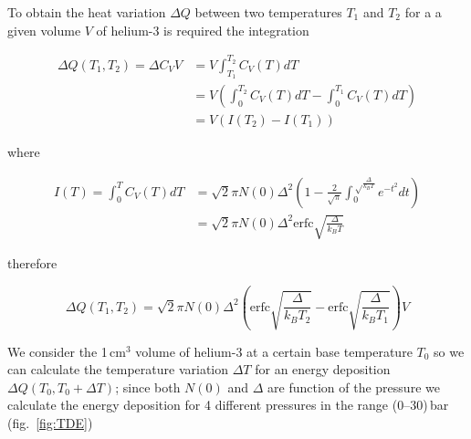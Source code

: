 \documentclass[a4paper,10pt]{article}
\begin{document}
To obtain the heat variation $\Delta Q$ between two temperatures $T_1$ and $T_2$ for a a given volume $V$ of helium-3 is required the integration

\begin{align}
\Delta Q (T_1,T_2) = \Delta C_V V & = V \int_{T_1}^{T_2} C_V(T)dT \\
                                  & = V \left( \int_{0}^{T_2} C_V(T)dT - \int_{0}^{T_1} C_V(T)dT \right)\\
                                  & = V \left( I(T_2) - I(T_1) \right)  
\end{align}

where

\begin{align}
I(T) = \int_{0}^{T} C_V(T)dT & = \sqrt{2} \pi N(0) \Delta^2 \left( 1 - \frac{2}{\sqrt{\pi}}\int_{0}^{\sqrt \frac{\Delta}{k_BT}} e^{-t^2} dt \right) \\ 
                             & =  \sqrt{2}\pi N(0)\Delta^2 \mathrm{erfc} \sqrt{\frac{\Delta}{k_BT} } 
\end{align}

therefore

\begin{equation}
\Delta Q (T_1,T_2) = \sqrt{2}\pi N(0)\Delta^2 \left( \mathrm{erfc}\sqrt{\frac{\Delta}{k_BT_2}} - \mathrm{erfc}\sqrt{\frac{\Delta}{k_BT_1}} \right)V
\end{equation}

We consider the 1\,cm$^3$ volume of helium-3 at a certain base temperature $T_0$ so we can calculate the temperature variation $\Delta T$ for an energy deposition $\Delta Q(T_0,T_0+\Delta T)$;
since both $N(0)$ and $\Delta$ are function of the pressure we calculate the energy deposition for 4 different pressures in the range (0--30)\,bar (fig.~\ref{fig:TDE})
\end{document}
